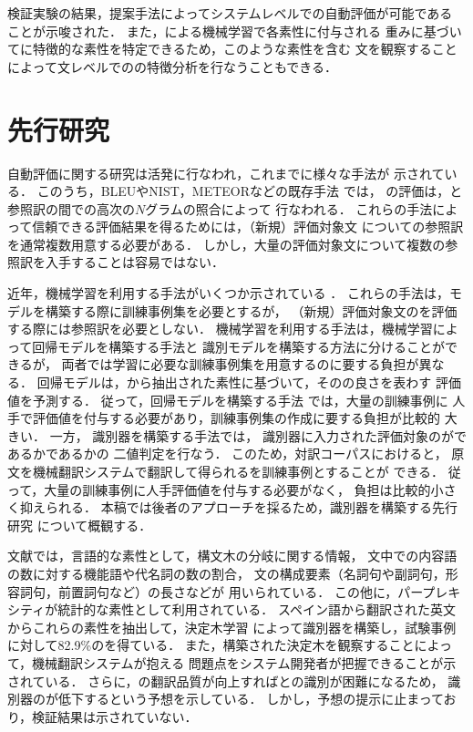 \documentclass[japanese]{jnlp_1.4}
\newcommand{\FLU}{}
\newcommand{\HUM}{}
\newcommand{\MT}{}
\newcommand{\SVM}{}
\newcommand{\ACC}{}
\begin{document}
検証実験の結果，提案手法によってシステムレベルでの自動評価が可能である
ことが示唆された．
また，{\SVM}\cite{Vapnik98}による機械学習で各素性に付与される
重みに基づいて{\MT}に特徴的な素性を特定できるため，このような素性を含む
文を観察することによって文レベルでの{\MT}の特徴分析を行なうこともできる．









\section{先行研究}
\label{sec:related_work}





自動評価に関する研究は活発に行なわれ，これまでに様々な手法が
示されている．
このうち，BLEUやNIST，METEORなどの既存手法
\cite{Papineni02,Doddington02,Banerjee05}では，
{\FLU}の評価は，{\MT}と参照訳の間での高次の$N$グラムの照合によって
行なわれる．
これらの手法によって信頼できる評価結果を得るためには，（新規）評価対象文
についての参照訳を通常複数用意する必要がある．
しかし，大量の評価対象文について複数の参照訳を入手することは容易ではない．

近年，機械学習を利用する手法がいくつか示されている
\cite{Oliver01,Kulesza04,Quirk04,Gamon05,Albrecht07a,Albrecht07b,Paul07a,Tanaka08}．
これらの手法は，モデルを構築する際に訓練事例集を必要とするが，
（新規）評価対象文の{\FLU}を評価する際には参照訳を必要としない．
機械学習を利用する手法は，機械学習によって回帰モデルを構築する手法と
識別モデルを構築する方法に分けることができるが，
両者では学習に必要な訓練事例集を用意するのに要する負担が異なる．
回帰モデルは，{\MT}から抽出された素性に基づいて，その{\MT}の良さを表わす
評価値を予測する．
従って，回帰モデルを構築する手法
\cite{Quirk04,Albrecht07a,Albrecht07b,Paul07a}では，大量の訓練事例に
人手で評価値を付与する必要があり，訓練事例集の作成に要する負担が比較的
大きい．
一方，
識別器を構築する手法\cite{Oliver01,Kulesza04,Gamon05,Tanaka08}では，
識別器に入力された評価対象の{\MT}が{\MT}であるか{\HUM}であるかの
二値判定を行なう．
このため，対訳コーパスにおける{\HUM}と，
原文を機械翻訳システムで翻訳して得られる{\MT}を訓練事例とすることが
できる．
従って，大量の訓練事例に人手評価値を付与する必要がなく，
負担は比較的小さく抑えられる．
本稿では後者のアプローチを採るため，識別器を構築する先行研究
について概観する．

文献\cite{Oliver01}では，言語的な素性として，構文木の分岐に関する情報，
文中での内容語の数に対する機能語や代名詞の数の割合，
文の構成要素（名詞句や副詞句，形容詞句，前置詞句など）の長さなどが
用いられている．
この他に，パープレキシティが統計的な素性として利用されている．
スペイン語から翻訳された英文からこれらの素性を抽出して，決定木学習
によって識別器を構築し，試験事例に対して82.9\%の{\ACC}を得ている．
また，構築された決定木を観察することによって，機械翻訳システムが抱える
問題点をシステム開発者が把握できることが示されている．
さらに，{\MT}の翻訳品質が向上すれば{\HUM}との識別が困難になるため，
識別器の{\ACC}が低下するという予想を示している．
しかし，予想の提示に止まっており，検証結果は示されていない．
\end{document}
